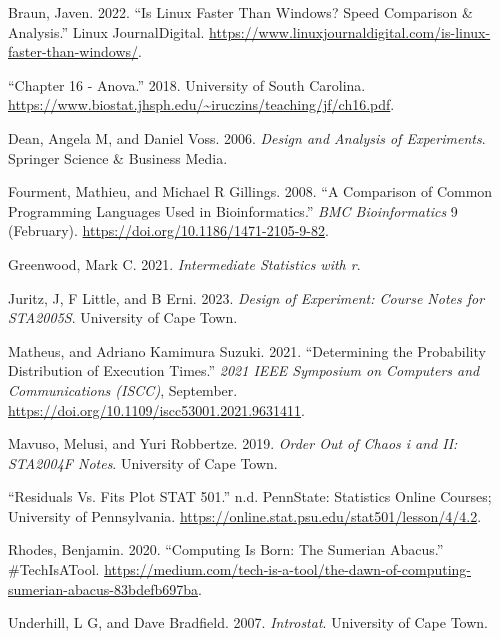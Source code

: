\documentclass[12pt,halfline,a4paper,]{ouparticle}
\newlength{\cslhangindent}
\newlength{\cslentryspacingunit} %
\newenvironment{CSLReferences}[2] %
 {%
  \setlength{\parindent}{0pt}
  \ifodd #1
  \let\oldpar\par
  \def\par{\hangindent=\cslhangindent\oldpar}
  \fi
  \setlength{\parskip}{#2\cslentryspacingunit}
 }%
 {}
\begin{document}
\hypertarget{refs}{}
\begin{CSLReferences}{1}{0}
\leavevmode{}%
Braun, Javen. 2022. {``Is Linux Faster Than Windows? Speed Comparison \&
Analysis.''} Linux JournalDigital.
\url{https://www.linuxjournaldigital.com/is-linux-faster-than-windows/}.

\leavevmode{}%
{``Chapter 16 - Anova.''} 2018. University of South Carolina.
\url{https://www.biostat.jhsph.edu/~iruczins/teaching/jf/ch16.pdf}.

\leavevmode{}%
Dean, Angela M, and Daniel Voss. 2006. \emph{Design and Analysis of
Experiments}. Springer Science \& Business Media.

\leavevmode{}%
Fourment, Mathieu, and Michael R Gillings. 2008. {``A Comparison of
Common Programming Languages Used in Bioinformatics.''} \emph{BMC
Bioinformatics} 9 (February).
\url{https://doi.org/10.1186/1471-2105-9-82}.

\leavevmode{}%
Greenwood, Mark C. 2021. \emph{Intermediate Statistics with r}.

\leavevmode{}%
Juritz, J, F Little, and B Erni. 2023. \emph{Design of Experiment:
Course Notes for STA2005S}. University of Cape Town.

\leavevmode{}%
Matheus, and Adriano Kamimura Suzuki. 2021. {``Determining the
Probability Distribution of Execution Times.''} \emph{2021 IEEE
Symposium on Computers and Communications (ISCC)}, September.
\url{https://doi.org/10.1109/iscc53001.2021.9631411}.

\leavevmode{}%
Mavuso, Melusi, and Yuri Robbertze. 2019. \emph{Order Out of Chaos i and
II: STA2004F Notes}. University of Cape Town.

\leavevmode{}%
{``Residuals Vs. Fits Plot \textbar{} STAT 501.''} n.d. PennState:
Statistics Online Courses; University of Pennsylvania.
\url{https://online.stat.psu.edu/stat501/lesson/4/4.2}.

\leavevmode{}%
Rhodes, Benjamin. 2020. {``Computing Is Born: The Sumerian Abacus.''}
\#TechIsATool.
\url{https://medium.com/tech-is-a-tool/the-dawn-of-computing-sumerian-abacus-83bdefb697ba}.

\leavevmode{}%
Underhill, L G, and Dave Bradfield. 2007. \emph{Introstat}. University
of Cape Town.

\end{CSLReferences}
\end{document}
